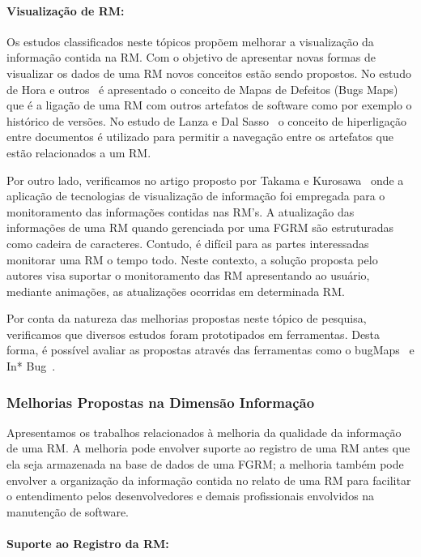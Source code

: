 \paragraph{Visualização de RM:} Os estudos classificados neste tópicos propõem
melhorar a visualização da informação contida na RM\@. Com o objetivo de
apresentar novas formas de visualizar os dados de uma RM novos conceitos estão
sendo propostos. No estudo de Hora e outros~\cite{hora2012bug} é apresentado o
conceito de Mapas de Defeitos (Bugs Maps) que é a ligação de uma RM com outros
artefatos de software como por exemplo o histórico de versões.  No estudo de
Lanza e  Dal Sasso~\cite{dal2014bug} o conceito de hiperligação entre documentos
é utilizado para permitir a navegação entre os artefatos que estão relacionados
a um RM\@.

Por outro lado, verificamos no artigo proposto por Takama e
Kurosawa~\cite{takama2013application} onde a aplicação de tecnologias de
visualização de informação foi empregada para o monitoramento das informações
contidas nas RM's. A atualização das informações de uma RM quando gerenciada por
uma FGRM são estruturadas como cadeira de caracteres. Contudo, é difícil para as
partes interessadas monitorar uma RM o tempo todo. Neste contexto, a solução
proposta pelo autores visa suportar o monitoramento das RM apresentando ao
usuário, mediante animações, as atualizações ocorridas em determinada RM\@.

Por conta da natureza das melhorias propostas neste tópico de pesquisa,
verificamos que diversos estudos foram prototipados em ferramentas. Desta forma,
é possível avaliar as propostas através das ferramentas como o
bugMaps~\cite{hora2012bug} e In* Bug~\cite{dal2014bug}.

\subsubsection{Melhorias Propostas na Dimensão Informação}
\label{ssub:melhorias_dim_informacao}

Apresentamos os trabalhos relacionados à melhoria da qualidade da informação de
uma RM\@. A melhoria pode envolver suporte ao registro de uma RM antes que ela
seja armazenada na base de dados de uma FGRM\@; a melhoria também pode envolver
a organização da informação contida no relato de uma RM para facilitar o
entendimento pelos desenvolvedores e demais profissionais envolvidos na
manutenção de software.

\paragraph{Suporte ao Registro da RM:}

